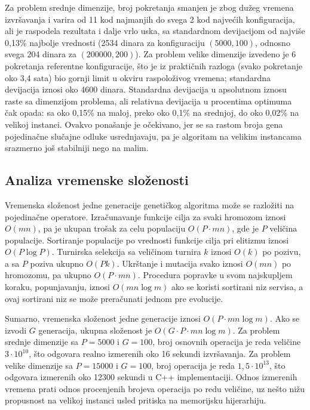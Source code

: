 \documentclass[12pt]{article}
\begin{document}
Za problem srednje dimenzije, broj pokretanja smanjen je zbog dužeg vremena izvršavanja i varira od 11 kod najmanjih do svega 2 kod najvećih konfiguracija, ali je raspodela rezultata i dalje vrlo uska, sa standardnom devijacijom od najviše 0{,}13\% najbolje vrednosti (2534 dinara za konfiguraciju $(5000, 100)$, odnosno svega 204 dinara za $(200000, 200)$). Za problem velike dimenzije izvedeno je 6 pokretanja referentne konfiguracije, što je iz praktičnih razloga (svako pokretanje oko 3,4 sata) bio gornji limit u okviru raspoloživog vremena; standardna devijacija iznosi oko 4600 dinara. Standardna devijacija u apsolutnom iznosu raste sa dimenzijom problema, ali relativna devijacija u procentima optimuma čak opada: sa oko 0{,}15\% na maloj, preko oko 0{,}1\% na srednjoj, do oko 0{,}02\% na velikoj instanci. Ovakvo ponašanje je očekivano, jer se sa rastom broja gena pojedinačne slučajne odluke usrednjavaju, pa je algoritam na velikim instancama srazmerno još stabilniji nego na malim.

\subsection{Analiza vremenske složenosti}

Vremenska složenost jedne generacije genetičkog algoritma može se razložiti na pojedinačne operatore. Izračunavanje funkcije cilja za svaki hromozom iznosi $O(mn)$, pa je ukupan trošak za celu populaciju $O(P \cdot mn)$, gde je $P$ veličina populacije. Sortiranje populacije po vrednosti funkcije cilja pri elitizmu iznosi $O(P \log P)$. Turnirska selekcija sa veličinom turnira $k$ iznosi $O(k)$ po pozivu, a sa $P$ poziva ukupno $O(Pk)$. Ukrštanje i mutacija svako iznosi $O(mn)$ po hromozomu, pa ukupno $O(P \cdot mn)$. Procedura popravke u svom najskupljem koraku, popunjavanju, iznosi $O(mn \log m)$ ako se koristi sortirani niz servisa, a ovaj sortirani niz se može preračunati jednom pre evolucije.

Sumarno, vremenska složenost jedne generacije iznosi $O(P \cdot mn \log m)$. Ako se izvodi $G$ generacija, ukupna složenost je $O(G \cdot P \cdot mn \log m)$. Za problem srednje dimenzije sa $P = 5000$ i $G = 100$, broj osnovnih operacija je reda veličine $3 \cdot 10^{10}$, što odgovara realno izmerenih oko 16 sekundi izvršavanja. Za problem velike dimenzije sa $P = 15000$ i $G = 100$, broj operacija je reda $1{,}5 \cdot 10^{13}$, što odgovara izmerenih oko 12300 sekundi u C++ implementaciji. Odnos izmerenih vremena prati odnos procenjenih brojeva operacija po redu veličine, uz nešto nižu propusnost na velikoj instanci usled pritiska na memorijsku hijerarhiju.
\end{document}
